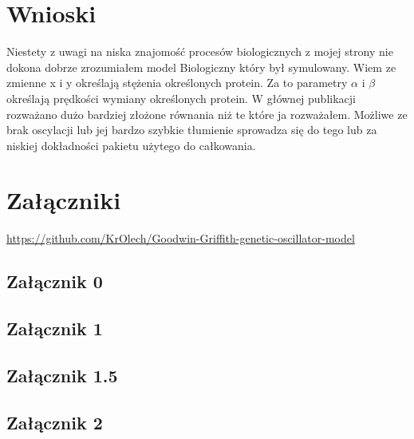 \documentclass{article}
\begin{document}
\section{Wnioski}
    Niestety z uwagi na niska znajomość procesów biologicznych z mojej strony nie dokona dobrze zrozumiałem model Biologiczny który był symulowany. Wiem ze zmienne x i y określają stężenia określonych protein. Za to parametry $\alpha$ i $\beta$ określają prędkości wymiany określonych protein. W głównej publikacji rozważano dużo bardziej złożone równania niż te które ja rozważałem. Możliwe ze brak oscylacji lub jej bardzo szybkie tłumienie sprowadza się do tego lub za niskiej dokładności pakietu użytego do całkowania.

\newpage
    \section{Załączniki}

        \url{https://github.com/KrOlech/Goodwin-Griffith-genetic-oscillator-model}

        \subsection{Załącznik 0}
        

        \newpage
        \subsection{Załącznik 1}
        

        \newpage
        \subsection{Załącznik 1.5}
        


        \newpage
        \subsection{Załącznik 2}
        
\end{document}
